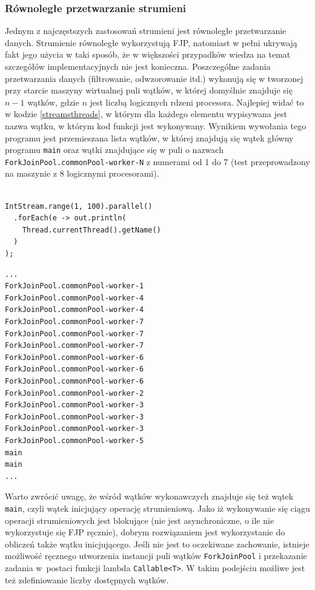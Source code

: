 \documentclass[12pt,twoside,openright]{extarticle}
\begin{document}
\subsubsection{Równoległe przetwarzanie strumieni}

    Jednym z najczęstszych zastosowań strumieni jest równoległe przetwarzanie danych. Strumienie równoległe wykorzystują FJP, natomiast w pełni ukrywają fakt jego użycia w taki sposób, że w większości przypadków wiedza na temat szczegółów implementacyjnych nie jest konieczna. Poszczególne zadania przetwarzania danych (filtrowanie, odwzorowanie itd.) wykonują się w tworzonej przy starcie maszyny wirtualnej puli wątków, w której domyślnie znajduje się $ n-1 $ wątków, gdzie $ n $ jest liczbą logicznych rdzeni procesora. Najlepiej widać to w kodzie \ref{streamsthreads}, w którym dla każdego elementu wypisywana jest nazwa wątku, w którym kod funkcji jest wykonywany.  Wynikiem wywołania tego programu jest przemieszana lista wątków, w której znajdują się wątek główny programu \texttt{main} oraz wątki znajdujące się w puli o nazwach \texttt{ForkJoinPool.commonPool-worker-N} z numerami od 1 do 7 (test przeprowadzony na maszynie z 8 logicznymi procesorami).

\begin{lstlisting}[label=streamsthreads, caption=Struktura puli wątków FJP]

IntStream.range(1, 100).parallel()
  .forEach(e -> out.println(
    Thread.currentThread().getName()
  )
);

\end{lstlisting}

\begin{verbatim}
...
ForkJoinPool.commonPool-worker-1
ForkJoinPool.commonPool-worker-4
ForkJoinPool.commonPool-worker-4
ForkJoinPool.commonPool-worker-7
ForkJoinPool.commonPool-worker-7
ForkJoinPool.commonPool-worker-7
ForkJoinPool.commonPool-worker-6
ForkJoinPool.commonPool-worker-6
ForkJoinPool.commonPool-worker-6
ForkJoinPool.commonPool-worker-2
ForkJoinPool.commonPool-worker-3
ForkJoinPool.commonPool-worker-3
ForkJoinPool.commonPool-worker-3
ForkJoinPool.commonPool-worker-5
main
main
...
\end{verbatim}

    Warto zwrócić uwagę, że wśród wątków wykonawczych znajduje się też wątek \texttt{main}, czyli wątek inicjujący operację strumieniową. Jako iż wykonywanie się ciągu operacji strumieniowych jest blokujące (nie jest asynchroniczne, o ile nie wykorzystuje się FJP ręcznie), dobrym rozwiązaniem jest wykorzystanie do obliczeń także wątku inicjującego. Jeśli nie jest to oczekiwane zachowanie, istnieje możliwość ręcznego utworzenia instancji puli wątków \texttt{ForkJoinPool} i przekazanie zadania w~postaci funkcji lambda \texttt{Callable<T>}. W takim podejściu możliwe jest też zdefiniowanie liczby dostępnych wątków.
\end{document}
